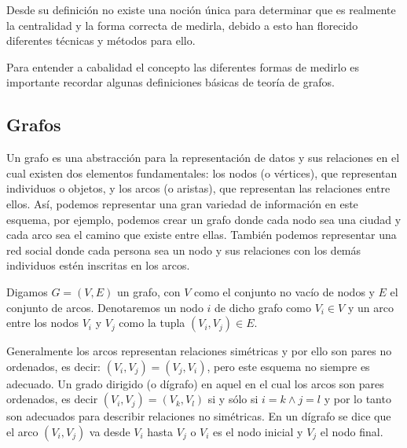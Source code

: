 Desde su definición no existe una noción única para determinar que es realmente 
la centralidad y la forma correcta de medirla\cite{freeman1979centrality},
debido a esto han florecido diferentes técnicas y métodos para ello.

Para entender a cabalidad el concepto las diferentes formas de medirlo es
importante recordar algunas definiciones básicas de teoría de grafos.

\subsection{Grafos}
Un grafo es una abstracción para la representación de datos y sus relaciones en
el cual existen dos elementos fundamentales: los nodos (o vértices), que
representan individuos o objetos, y los arcos (o aristas), que representan las
relaciones entre ellos.
Así, podemos representar una gran variedad de información en este esquema, por
ejemplo, podemos crear un grafo donde cada nodo sea una ciudad y cada arco
sea el camino que existe entre ellas. También podemos representar una red
social donde cada persona sea un nodo y sus relaciones con los demás individuos
estén inscritas en los arcos.

Digamos $G=(V, E)$ un grafo, con $V$ como el conjunto no vacío de nodos y $E$ el
conjunto de arcos.
Denotaremos un nodo $i$ de dicho grafo como  $V_i \in V$ y un arco entre los
nodos $V_i$ y $V_j$ como la tupla $(V_i, V_j) \in E$.

Generalmente los arcos representan relaciones simétricas y por ello son pares no
ordenados, es decir: $(V_i, V_j) = (V_j, V_i)$, pero este esquema no siempre es
adecuado. Un grado dirigido (o dígrafo) en aquel en el cual los arcos son pares
ordenados, es decir $(V_i, V_j) = (V_k, V_l)$ si y sólo si $i=k \land j=l$ y por
lo tanto son adecuados para describir relaciones no simétricas. En un dígrafo se
dice que el arco $(V_i, V_j)$ va desde $V_i$ hasta $V_j$ o $V_i$ es el nodo
inicial y $V_j$ el nodo final.

